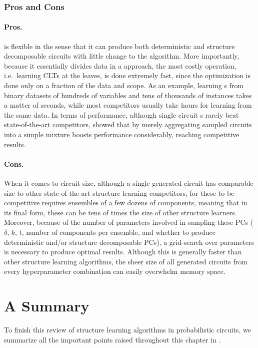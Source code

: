\subsubsection{Pros and Cons}

\paragraph{Pros.}  is flexible in the sense that it can produce both deterministic
and structure decomposable circuits with little change to the algorithm. More importantly, because
it essentially divides data in a \divclass{} approach, the most costly operation, i.e.\ learning
CLTs at the leaves, is done extremely fast, since the optimization is done only on a fraction of
the data and scope. As an example, learning s from binary datasets of hundreds of
variables and tens of thousands of instances takes a matter of seconds, while most competitors
usually take hours for learning from the same data. In terms of performance, although single
circuit s rarely beat state-of-the-art competitors, \citet{dimauro21} showed that by
merely aggregating sampled circuits into a simple mixture boosts performance considerably, reaching
competitive results.

\paragraph{Cons.} When it comes to circuit size, although a single  generated circuit
has comparable size to other state-of-the-art structure learning competitors, for these to be
competitive requires ensembles of a few dozens of components, meaning that in its final form, these
can be tens of times the size of other structure learners. Moreover, because of the number of
parameters involved in sampling these PCs ($\delta$, $k$, $t$, number of components per ensemble,
and whether to produce deterministic and/or structure decomposable PCs), a grid-search over
parameters is necessary to produce optimal results. Although this is generally faster than other
structure learning algorithms, the sheer size of all generated circuits from every hyperparameter
combination can easily overwhelm memory space.

\section{A Summary}

To finish this review of structure learning algorithms in probabilistic circuits, we summarize all
the important points raised throughout this chapter in .

